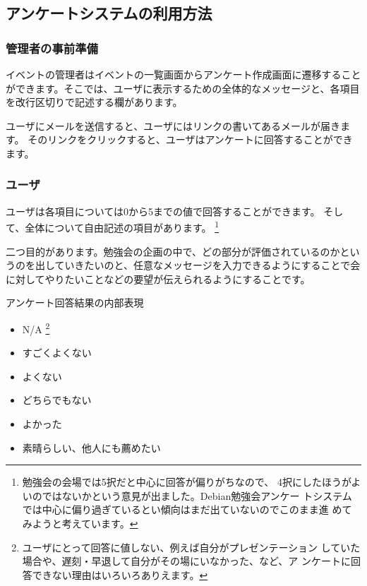 \documentclass[mingoth,a4paper]{jsarticle}
\begin{document}
\subsection{アンケートシステムの利用方法}

\subsubsection{管理者の事前準備}

イベントの管理者はイベントの一覧画面からアンケート作成画面に遷移すること
ができます。そこでは、ユーザに表示するための全体的なメッセージと、各項目
を改行区切りで記述する欄があります。

ユーザにメールを送信すると、ユーザにはリンクの書いてあるメールが届きます。
そのリンクをクリックすると、ユーザはアンケートに回答することができます。

\subsubsection{ユーザ}

ユーザは各項目については0から5までの値で回答することができます。
そして、全体について自由記述の項目があります。
\footnote{勉強会の会場では5択だと中心に回答が偏りがちなので、
4択にしたほうがよいのではないかという意見が出ました。Debian勉強会アンケー
トシステムでは中心に偏り過ぎているとい傾向はまだ出ていないのでこのまま進
めてみようと考えています。}

二つ目的があります。勉強会の企画の中で、どの部分が評価されているのかとい
うのを出していきたいのと、任意なメッセージを入力できるようにすることで会
に対してやりたいことなどの要望が伝えられるようにすることです。

\begin{table}[h]
 \caption{アンケート回答結果の内部表現}
 \begin{itemize}
  \item[0.] N/A \footnote{ユーザにとって回答に値しない、例えば自分がプレゼンテーション
	    していた場合や、遅刻・早退して自分がその場にいなかった、など、ア
	    ンケートに回答できない理由はいろいろありえます。}
  \item[1.] すごくよくない
  \item[2.] よくない
  \item[3.] どちらでもない
  \item[4.] よかった
  \item[5.] 素晴らしい、他人にも薦めたい
 \end{itemize}
\end{table}
\end{document}
